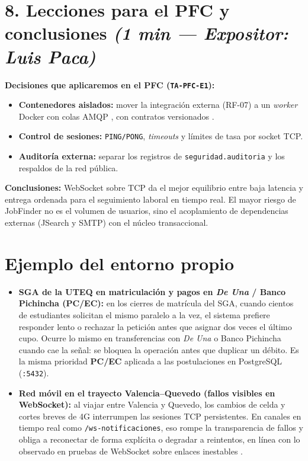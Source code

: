 \documentclass[11pt,a4paper]{article}
\newcommand{\expo}[2]{\hfill{\small\textit{(#1 — Expositor: #2)}}}
\begin{document}
\section*{8. Lecciones para el PFC y conclusiones \expo{1 min}{Luis Paca}}
\textbf{Decisiones que aplicaremos en el PFC (\texttt{TA-PFC-E1}):}
\begin{itemize}
  \item \textbf{Contenedores aislados:} mover la integración externa (RF-07) a un
        \textit{worker} Docker con colas AMQP \cite{petrescu2025iotprotocols}, con
        contratos versionados \cite{ref4}.
  \item \textbf{Control de sesiones:} \texttt{PING/PONG}, \textit{timeouts} y
        límites de tasa por socket TCP.
  \item \textbf{Auditoría externa:} separar los registros de
        \texttt{seguridad.auditoria} y los respaldos de la red pública.
\end{itemize}
\textbf{Conclusiones:} WebSocket sobre TCP da el mejor equilibrio entre baja
latencia y entrega ordenada para el seguimiento laboral en tiempo real. El mayor
riesgo de JobFinder no es el volumen de usuarios, sino el acoplamiento de
dependencias externas (JSearch y SMTP) con el núcleo transaccional.

\section*{Ejemplo del entorno propio}
\begin{itemize}
  \item \textbf{SGA de la UTEQ en matriculación y pagos en \textit{De Una} /
        Banco Pichincha (PC/EC):} en los cierres de matrícula del SGA, cuando
        cientos de estudiantes solicitan el mismo paralelo a la vez, el sistema
        prefiere responder lento o rechazar la petición antes que asignar dos
        veces el último cupo. Ocurre lo mismo en transferencias con \textit{De Una}
        o Banco Pichincha cuando cae la señal: se bloquea la operación antes que
        duplicar un débito. Es la misma prioridad \textbf{PC/EC} aplicada a las
        postulaciones en PostgreSQL (\texttt{:5432}).
  \item \textbf{Red móvil en el trayecto Valencia--Quevedo (fallos visibles en
        WebSocket):} al viajar entre Valencia y Quevedo, los cambios de celda y
        cortes breves de 4G interrumpen las sesiones TCP persistentes. En canales
        en tiempo real como \texttt{/ws-notificaciones}, eso rompe la transparencia
        de fallos y obliga a reconectar de forma explícita o degradar a reintentos,
        en línea con lo observado en pruebas de WebSocket sobre enlaces inestables
        \cite{mitrovic2023websocket,ref3}.
\end{itemize}
\end{document}
